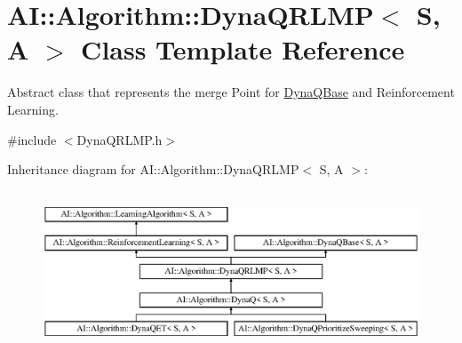 \hypertarget{classAI_1_1Algorithm_1_1DynaQRLMP}{\section{A\-I\-:\-:Algorithm\-:\-:Dyna\-Q\-R\-L\-M\-P$<$ S, A $>$ Class Template Reference}
\label{classAI_1_1Algorithm_1_1DynaQRLMP}
}


Abstract class that represents the merge Point for \hyperlink{classAI_1_1Algorithm_1_1DynaQBase}{Dyna\-Q\-Base} and Reinforcement Learning.  




{\ttfamily \#include $<$Dyna\-Q\-R\-L\-M\-P.\-h$>$}

Inheritance diagram for A\-I\-:\-:Algorithm\-:\-:Dyna\-Q\-R\-L\-M\-P$<$ S, A $>$\-:\begin{figure}[H]
\begin{center}
\leavevmode
\includegraphics[height=4.794520cm]{classAI_1_1Algorithm_1_1DynaQRLMP}
\end{center}
\end{figure}
